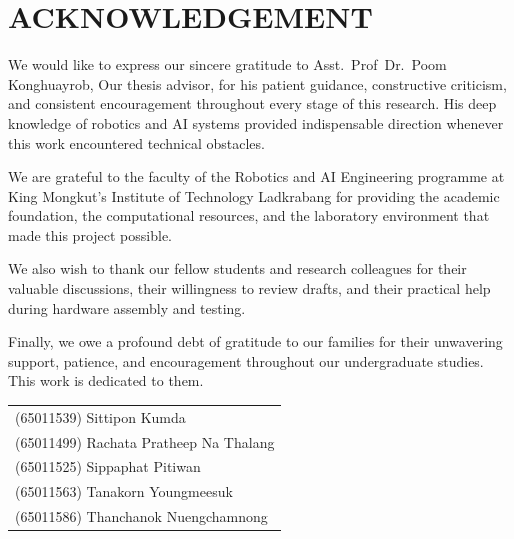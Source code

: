 \chapter*{ACKNOWLEDGEMENT}

We would like to express our sincere gratitude to Asst.~Prof~Dr.~Poom Konghuayrob, Our thesis
advisor, for his patient guidance, constructive criticism, and consistent encouragement
throughout every stage of this research. His deep knowledge of robotics and AI systems
provided indispensable direction whenever this work encountered technical obstacles.

We are grateful to the faculty of the Robotics and AI Engineering programme at King
Mongkut's Institute of Technology Ladkrabang for providing the academic foundation,
the computational resources, and the laboratory environment that made this project
possible.

We also wish to thank our fellow students and research colleagues for their valuable
discussions, their willingness to review drafts, and their practical help during
hardware assembly and testing.

Finally, we owe a profound debt of gratitude to our families for their unwavering support,
patience, and encouragement throughout our undergraduate studies. This work is dedicated
to them.

\vspace{1.5cm} %
\noindent\hfill
\begin{tabular}{l}
(65011539) Sittipon Kumda \\
(65011499) Rachata Pratheep Na Thalang \\
(65011525) Sippaphat Pitiwan \\
(65011563) Tanakorn Youngmeesuk \\
(65011586) Thanchanok Nuengchamnong
\end{tabular}